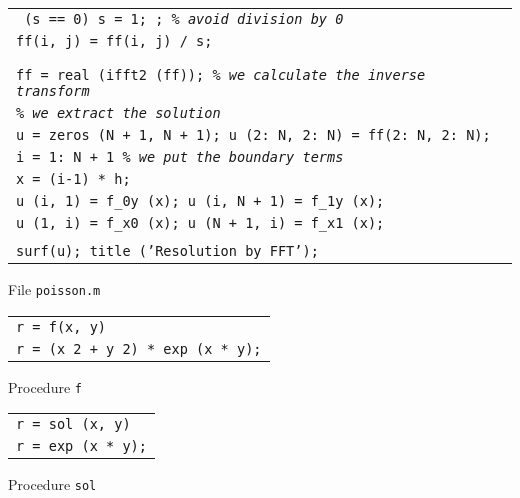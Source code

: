 \begin{listing}
\begin{footnotesize}
{\begin{tabular}{l}
\quad \quad \texttt{\pif{} (s == 0) s = 1; \pend{}; \textit{\% avoid division by 0}} \\
\quad \quad \texttt{ff(i, j) = ff(i, j) / s;} \\
\quad \texttt{\pend} \\
\texttt{\pend} \\
\texttt{ff = real (ifft2 (ff)); \textit{\% we calculate the inverse transform}} \\
\texttt{\textit{\% we extract the solution}} \\
\texttt{u = zeros (N + 1, N + 1); u (2: N, 2: N) = ff(2: N, 2: N);} \\
\texttt{\pfor i = 1: N + 1 \textit{\% we put the boundary terms}} \\
\quad \texttt{x = (i-1) * h;} \\
\quad \texttt{u (i, 1) = f\_0y (x); u (i, N + 1) = f\_1y (x);} \\
\quad \texttt{u (1, i) = f\_x0 (x); u (N + 1, i) = f\_x1 (x);} \\
\texttt{\pend} \\
\texttt{surf(u); title ('Resolution by FFT');} \\
\end{tabular}
}
\noindent \end{footnotesize}
 
\caption{File \texttt{poisson.m}}
 
\label{fish-listing}
\end{listing}
 
\begin{listing} \begin{footnotesize}
\noindent
{\upshape
\begin{tabular}{l} \texttt{\pfunction r = f(x, y)} \\
\texttt{r = (x{\hatverb} 2 + y{\hatverb} 2) * exp (x * y);} \\
\end{tabular}
}
\noindent \end{footnotesize}
\caption{Procedure \texttt{\upshape f}}
\label{listing-f}
\end{listing}
 
\begin{listing} \begin{footnotesize}
\noindent
{\upshape
\begin{tabular}{l} \texttt{\pfunction r = sol (x, y)} \\
\texttt{r = exp (x * y);} \\
\end{tabular}
}
\noindent \end{footnotesize}
\caption{Procedure \texttt{\upshape sol}}
\label{listing-sol}
\end{listing}
 
